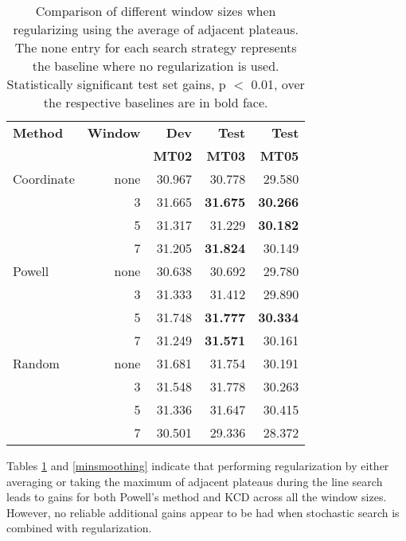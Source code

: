 \documentclass[11pt]{article}
\begin{document}
\begin{table}
\begin{center}
\begin{tabular}{|l|rrrr|}
\hline \bf Method  & \bf Window & \bf Dev & \bf Test & \bf Test \\
                   &            & \bf MT02 & \bf MT03 & \bf MT05 \\ \hline
Coordinate & none &  30.967 & 30.778 & 29.580 \\
           & 3  & 31.665  & {\bf 31.675}  & {\bf 30.266} \\
           & 5  & 31.317  & 31.229  & {\bf 30.182}  \\
           & 7  & 31.205  & {\bf 31.824}  & 30.149 \\ \hline
Powell     & none & 30.638 & 30.692  & 29.780 \\ 
           & 3  & 31.333  & 31.412  & 29.890 \\
           & 5  & 31.748  & {\bf 31.777} &  {\bf 30.334} \\
           & 7  & 31.249  & {\bf 31.571} &  30.161 \\ \hline
Random     & none & 31.681 & 31.754 & 30.191 \\
           & 3  & 31.548  & 31.778  & 30.263 \\
           & 5  & 31.336  & 31.647  & 30.415  \\
           & 7  & 30.501  & 29.336  & 28.372 \\
\hline
\end{tabular}
\end{center}
\caption{
\label{avgsmoothing}
Comparison of different window sizes when regularizing using the average of adjacent plateaus. 
The none entry for each search strategy represents the baseline where no regularization is used. Statistically significant test set gains, p $<$ 0.01, over the respective baselines are in bold face. 
}
\end{table}

Tables \ref{avgsmoothing} and \ref{minsmoothing} indicate that performing regularization by either averaging or taking the maximum of adjacent plateaus during the line search leads to gains for both Powell's method and KCD across all the window sizes. However, no reliable additional gains appear to be had when stochastic search is combined with regularization.
\end{document}
